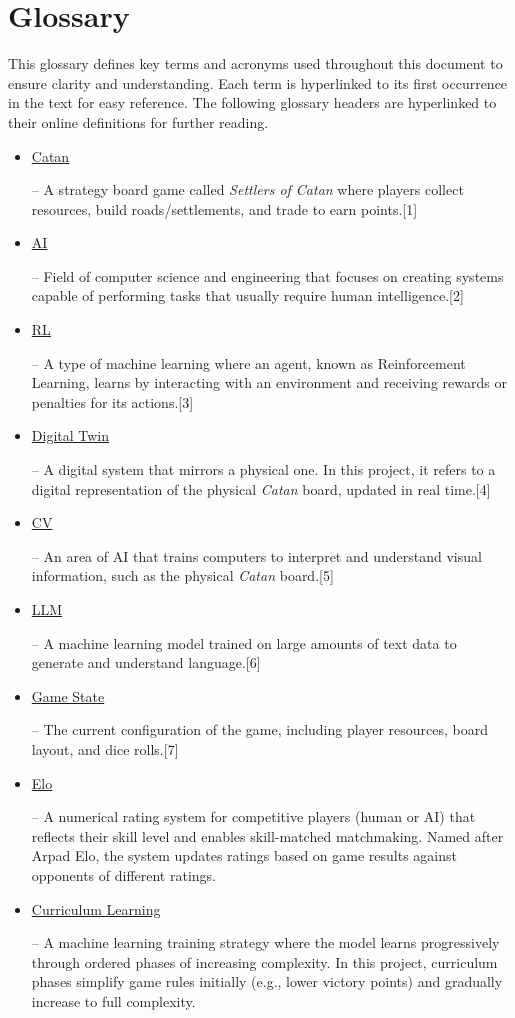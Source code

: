 \documentclass{article}
\newcommand{\CatanExt}{\href{https://en.wikipedia.org/wiki/Catan}{Catan}}
\newcommand{\AIExt}{\href{https://en.wikipedia.org/wiki/Artificial_intelligence}{AI}}
\newcommand{\RLExt}{\href{https://www.ibm.com/think/topics/reinforcement-learning}{RL}}
\newcommand{\DigitalTwinExt}{\href{https://en.wikipedia.org/wiki/Digital_twin}{Digital Twin}}
\newcommand{\CVExt}{\href{https://www.ibm.com/think/topics/computer-vision}{CV}}
\newcommand{\LLMExt}{\href{https://www.cloudflare.com/learning/ai/what-is-large-language-model/}{LLM}}
\newcommand{\GameStateExt}{\href{https://milvus.io/ai-quick-reference/what-is-a-state-in-rl}{Game State}}
\newcommand{\EloExt}{\href{https://en.wikipedia.org/wiki/Elo_rating_system}{Elo}}
\newcommand{\CurriculumLearningExt}{\href{https://en.wikipedia.org/wiki/Curriculum_learning}{Curriculum Learning}}
\begin{document}
\section*{Glossary}
\raggedright This glossary defines key terms and acronyms used throughout this document to ensure clarity and understanding. Each term is hyperlinked to its first occurrence in the text for easy reference.
The following glossary headers are hyperlinked to their online definitions for further reading.
\begin{itemize}
    \item \hypertarget{glossary-catan}{\CatanExt{}} – A strategy board game called \textit{Settlers of Catan} where players collect resources, build roads/settlements, and trade to earn points.[1]
    \item \hypertarget{glossary-ai}{\AIExt{}} – Field of computer science and engineering that focuses on creating systems capable of performing tasks that usually require human intelligence.[2]
    \item \hypertarget{glossary-rl}{\RLExt{}} – A type of machine learning where an agent, known as Reinforcement Learning, learns by interacting with an environment and receiving rewards or penalties for its actions.[3]
    \item \hypertarget{glossary-dt}{\DigitalTwinExt{}} – A digital system that mirrors a physical one. In this project, it refers to a digital representation of the physical \emph{Catan} board, updated in real time.[4]
    \item \hypertarget{glossary-cv}{\CVExt{}} – An area of AI that trains computers to interpret and understand visual information, such as the physical \emph{Catan} board.[5]
    \item \hypertarget{glossary-llm}{\LLMExt{}} – A machine learning model trained on large amounts of text data to generate and understand language.[6]
    \item \hypertarget{glossary-gamestate}{\GameStateExt{}} – The current configuration of the game, including player resources, board layout, and dice rolls.[7]
    \item \hypertarget{glossary-elo}{\EloExt{}} – A numerical rating system for competitive players (human or AI) that reflects their skill level and enables skill-matched matchmaking. Named after Arpad Elo, the system updates ratings based on game results against opponents of different ratings.
    \item \hypertarget{glossary-curriculum}{\CurriculumLearningExt} – A machine learning training strategy where the model learns progressively through ordered phases of increasing complexity. In this project, curriculum phases simplify game rules initially (e.g., lower victory points) and gradually increase to full complexity.

\end{itemize}
\end{document}
